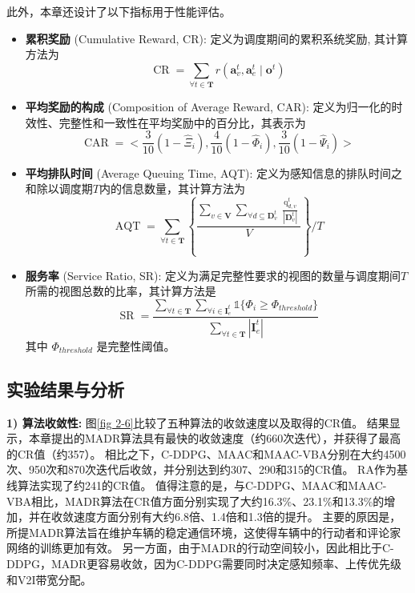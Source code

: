 此外，本章还设计了以下指标用于性能评估。
\begin{itemize}
	\item \textbf{累积奖励} (Cumulative Reward, CR): 定义为调度期间的累积系统奖励, 其计算方法为
		\begin{equation}
			\operatorname{CR} = \sum_{\forall t \in \mathbf{T}} r\left(\boldsymbol{a}_{v}^{t},\boldsymbol{a}_{e}^{t} \mid \boldsymbol{o}^{t}\right)
		\end{equation}
	\item \textbf{平均奖励的构成} (Composition of Average Reward, CAR): 定义为归一化的时效性、完整性和一致性在平均奖励中的百分比，其表示为
		\begin{equation}
			\operatorname{CAR} = <\frac{3}{10}(1-\hat{\Xi}_{i}),\frac{4}{10}(1-\hat{\Phi}_{i}), \frac{3}{10}(1-\hat{\Psi}_{i})>
		\end{equation}
	\item \textbf{平均排队时间} (Average Queuing Time, AQT): 定义为感知信息的排队时间之和除以调度期$T$内的信息数量，其计算方法为 
		\begin{equation}
			\operatorname{AQT} =\sum_{\forall t \in \mathbf{T}} \left \{ \frac{\sum_{v \in \mathbf{V}} \sum_{\forall d \subseteq \mathbf{D}_{v}^t} \frac{\operatorname{q}_{d, v}^t}{|\mathbf{D}_{v}^t|} }{V} \right\} \bigg/ T
		\end{equation}
	\item \textbf{服务率} (Service Ratio, SR): 定义为满足完整性要求的视图的数量与调度期间$T$所需的视图总数的比率，其计算方法是 
		\begin{equation}
			\operatorname{SR} = \frac{\sum_{\forall t \in \mathbf{T}}\sum_{\forall i \in \mathbf{I}_e^t} \mathds{1}\{\Phi_{i} \geq \Phi_{threshold}\}}{ \sum_{\forall t \in \mathbf{T}} |\mathbf{I}_e^t|}
		\end{equation}
	其中 $\Phi_{threshold}$ 是完整性阈值。
\end{itemize}

\subsection{实验结果与分析}

\textbf{1) 算法收敛性:}
图\ref{fig 2-6}比较了五种算法的收敛速度以及取得的CR值。
结果显示，本章提出的MADR算法具有最快的收敛速度（约660次迭代），并获得了最高的CR值（约357）。
相比之下，C-DDPG、MAAC和MAAC-VBA分别在大约4500次、950次和870次迭代后收敛，并分别达到约307、290和315的CR值。
RA作为基线算法实现了约241的CR值。
值得注意的是，与C-DDPG、MAAC和MAAC-VBA相比，MADR算法在CR值方面分别实现了大约16.3\%、23.1\%和13.3\%的增加，并在收敛速度方面分别有大约6.8倍、1.4倍和1.3倍的提升。
主要的原因是，所提MADR算法旨在维护车辆的稳定通信环境，这使得车辆中的行动者和评论家网络的训练更加有效。
另一方面，由于MADR的行动空间较小，因此相比于C-DDPG，MADR更容易收敛，因为C-DDPG需要同时决定感知频率、上传优先级和V2I带宽分配。

